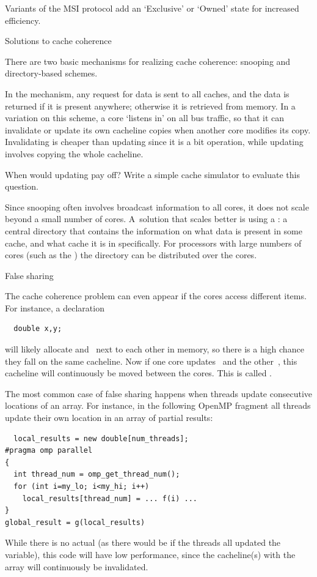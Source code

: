 Variants of the \ac{MSI} protocol add an `Exclusive' or `Owned' state
for increased efficiency.

 {Solutions to cache coherence}

There are two basic  mechanisms for realizing cache coherence:
snooping and directory-based schemes.

In the  mechanism, any request for data is sent
to all caches, and the data is returned if it is present anywhere;
otherwise it is retrieved from memory. In a variation on this scheme,
a core 
`listens in' on all bus traffic, so that it can invalidate or update its own cacheline 
copies when another core modifies its copy. Invalidating is cheaper than updating
since it is a bit operation, while updating involves copying the whole cacheline.

\begin{exercise}
  When would updating pay off? Write a simple cache simulator to evaluate this question.
\end{exercise}

Since snooping often involves broadcast information to all cores, it
does not scale beyond a small number of cores. A~solution that scales
better is using a : a central directory
that contains the information on what data is present in some cache,
and what cache it is in specifically. For processors with large
numbers of cores (such as the ) the
directory can be distributed over the cores.

 {False sharing}
\label{sec:falseshare}

The cache coherence problem can even appear if the cores access
different items. For instance, a declaration
\begin{verbatim}
  double x,y;
\end{verbatim}
will likely allocate  and~ next to each other in memory, so
there is a high chance they fall on the same cacheline. Now if one
core updates~ and the other~, this cacheline will
continuously be moved between the cores. This is called
.

The most common case of false sharing happens when
threads update consecutive locations of an array. For instance, in the
following OpenMP fragment all threads update their own location in an
array of partial results:
\begin{verbatim}
  local_results = new double[num_threads];
#pragma omp parallel
{
  int thread_num = omp_get_thread_num();
  for (int i=my_lo; i<my_hi; i++)
    local_results[thread_num] = ... f(i) ...
}
global_result = g(local_results)
\end{verbatim}
While there is no actual  (as there would be
if the threads all updated the  variable),
this code will have low performance, since the cacheline(s) with the
 array will continuously be invalidated.

